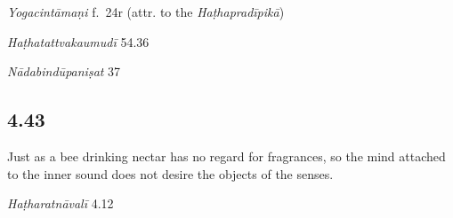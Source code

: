 \begin{ekdosis}

\begin{testimonia}[hp04_042]
\emph{Yogacintāmaṇi} f.~24r (attr. to the \emph{Haṭhapradīpikā})
\begin{versinnote}
\end{versinnote}

\emph{Haṭhatattvakaumudī} 54.36
\begin{versinnote}
\end{versinnote}

\emph{Nādabindūpaniṣat} 37
\begin{versinnote}
\end{versinnote}
\end{testimonia}


\subsection*{4.43}
\begin{translation}[hp04_043]
Just as a bee drinking nectar has no regard for fragrances, so the mind attached to the inner sound does not desire the objects of the senses.
\end{translation}


\begin{testimonia}[hp04_043]
\emph{Haṭharatnāvalī} 4.12
\begin{versinnote}
\end{versinnote}


\end{testimonia}
\end{ekdosis}
